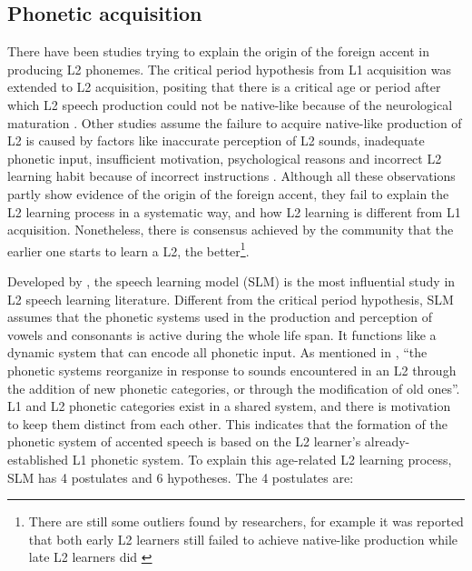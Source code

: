 \subsection{Phonetic acquisition}

There have been studies trying to explain the origin of the foreign accent in producing L2 phonemes. The critical period hypothesis from L1 acquisition was extended to L2 acquisition, positing that there is a critical age or period after which L2 speech production could not be native-like because of the neurological maturation \citep{long1990maturational}. Other studies assume the failure to acquire native-like production of L2 is caused by factors like inaccurate perception of L2 sounds, inadequate phonetic input, insufficient motivation, psychological reasons and incorrect L2 learning habit because of incorrect instructions \citep{flege1988production}. Although all these observations partly show evidence of the origin of the foreign accent, they fail to explain the L2 learning process in a systematic way, and how L2 learning is different from L1 acquisition. Nonetheless, there is consensus achieved by the community that the earlier one starts to learn a L2, the better\footnote{There are still some outliers found by researchers, for example it was reported that both early L2 learners still failed to achieve native-like production while late L2 learners did \citep{flege1995second}}.

Developed by \cite{flege1995second}, the speech learning model (SLM) is the most influential study in L2 speech learning literature. Different from the critical period hypothesis, SLM assumes that the phonetic systems used in the production and perception of vowels and consonants is active during the whole life span. It functions like a dynamic system that can encode all phonetic input. As mentioned in \citep{flege1995second}, ``the phonetic systems reorganize in response to sounds encountered in an L2 through the addition of new phonetic categories, or through the modification of old ones''. L1 and L2 phonetic categories exist in a shared system, and there is motivation to keep them distinct from each other. This indicates that the formation of the phonetic system of accented speech is based on the L2 learner's already-established L1 phonetic system. To explain this age-related L2 learning process, SLM has 4 postulates and 6 hypotheses. The 4 postulates \citep{flege1995second} are:

